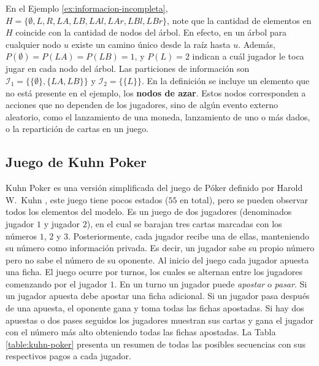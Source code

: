En el Ejemplo \ref{ex:informacion-incompleta}, $H = \{ \emptyset, L, R, LA, LB, LAl, LAr, LBl, LBr\}$, note que la cantidad de elementos en $H$ coincide con la cantidad de nodos del árbol. En efecto, en un árbol para cualquier nodo $u$ existe un camino único desde la raíz hasta $u$. Además, $P(\emptyset) = P(LA) = P(LB) = 1$, y $P(L) = 2$ indican a cuál jugador le toca jugar en cada nodo del árbol. Las particiones de información son $\mathcal{I}_1 = \{\{\emptyset\}, \{LA, LB\}\}$ y $\mathcal{I}_2  = \{\{L\}\}$. En la definición se incluye un elemento que no está presente en el ejemplo, los \textbf{nodos de azar}. Estos nodos corresponden a acciones que no dependen de los jugadores, sino de algún evento externo aleatorio, como el lanzamiento de una moneda, lanzamiento de uno o más dados, o la repartición de cartas en un juego.

\subsection*{Juego de Kuhn Poker}
\label{section:kuhn-poker}

Kuhn Poker es una versión simplificada del juego de Póker definido por Harold W.\ Kuhn \cite{bib:kuhn-poker}, este juego tiene pocos estados ($55$ en total), pero se pueden observar todos los elementos del modelo. Es un juego de dos jugadores (denominados jugador $1$ y jugador $2$), en el cual se barajan tres cartas marcadas con los números $1$, $2$ y $3$. Posteriormente, cada jugador recibe una de ellas, manteniendo su número como información privada. Es decir, un jugador sabe su propio número pero no sabe el número de su oponente. Al inicio del juego cada jugador apuesta una ficha. El juego ocurre por turnos, los cuales se alternan entre los jugadores comenzando por el jugador $1$. En un turno un jugador puede \textit{apostar} o \textit{pasar}. Si un jugador apuesta debe apostar una ficha adicional. Si un jugador pasa después de una apuesta, el oponente gana y toma todas las fichas apostadas. Si hay dos apuestas o dos pases seguidos los jugadores muestran sus cartas y gana el jugador con el número más alto obteniendo todas las fichas apostadas. La Tabla \ref{table:kuhn-poker} presenta un resumen de todas las posibles secuencias con sus respectivos pagos a cada jugador.

